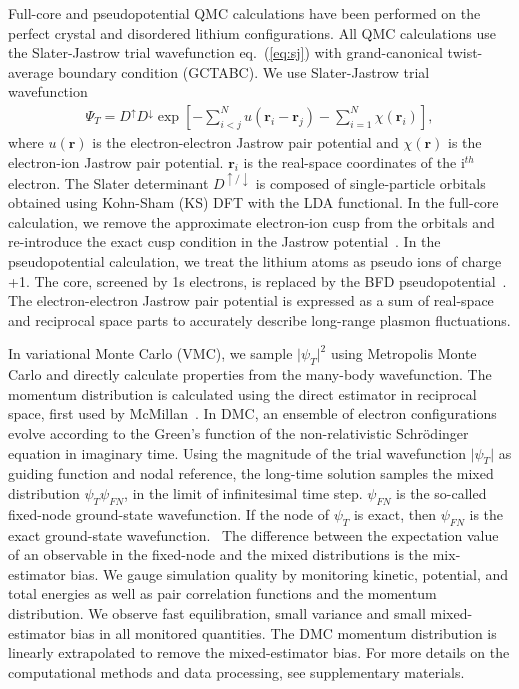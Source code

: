 \documentclass[aps,prb,showpacs,preprintnumbers,amsmath,amssymb,superscriptaddress,twocolumn]{revtex4-1}
\newcommand{\bs}{\boldsymbol}
\newcommand{\up}{\uparrow}
\newcommand{\down}{\downarrow}
\begin{document}
Full-core and pseudopotential QMC calculations have been performed on the perfect crystal and disordered lithium configurations. All QMC calculations use the Slater-Jastrow trial wavefunction eq.~(\ref{eq:sj}) with grand-canonical twist-average boundary condition (GCTABC). We use Slater-Jastrow trial wavefunction
\begin{align}
\Psi_T = D^{\up} D^{\down} \exp\left[ -\sum\limits_{i<j}^{N} u(\bs{r}_i-\bs{r}_j) - \sum\limits_{i=1}^N \chi(\bs{r}_i) \right],\label{eq:sj}
\end{align}
where $u(\bs{r})$ is the electron-electron Jastrow pair potential and $\chi(\bs{r})$ is the electron-ion Jastrow pair potential. $\bs{r}_i$ is the real-space coordinates of the i$^{th}$ electron. The Slater determinant $D^{\up/\down}$ is composed of single-particle orbitals obtained using Kohn-Sham (KS) DFT with the LDA functional. In the full-core calculation, we remove the approximate electron-ion cusp from the orbitals and re-introduce the exact cusp condition in the Jastrow potential~\cite{Ceperley1981}. In the pseudopotential calculation, we treat the lithium atoms as pseudo ions of charge +1. The core, screened by 1s electrons, is replaced by the BFD pseudopotential~\cite{Burkatzki2007}.  The electron-electron Jastrow pair potential is expressed as a sum of real-space and reciprocal space parts to accurately describe long-range plasmon fluctuations.

In variational Monte Carlo (VMC), we sample $\vert \psi_T \vert^2$ using Metropolis Monte Carlo and directly calculate properties from the many-body wavefunction. The momentum distribution is calculated using the direct estimator in reciprocal space, first used by McMillan~\cite{W.L.McMillan1965}. In DMC, an ensemble of electron configurations evolve according to the Green's function of the non-relativistic Schr\"odinger equation in imaginary time. Using the magnitude of the trial wavefunction $\vert \psi_T\vert$ as guiding function and nodal reference, the long-time solution samples the mixed distribution $\psi_T\psi_{FN}$, in the limit of infinitesimal time step. $\psi_{FN}$ is the so-called fixed-node ground-state wavefunction. If the node of $\psi_T$ is exact, then $\psi_{FN}$ is the exact ground-state wavefunction.~\cite{Foulkes2001} The difference between the expectation value of an observable in the fixed-node and the mixed distributions is the mix-estimator bias. We gauge simulation quality by monitoring kinetic, potential, and total energies as well as pair correlation functions and the momentum distribution. We observe fast equilibration, small variance and small mixed-estimator bias in all monitored quantities. The DMC momentum distribution is linearly extrapolated to remove the mixed-estimator bias. For more details on the computational methods and data processing, see supplementary materials.
\end{document}
